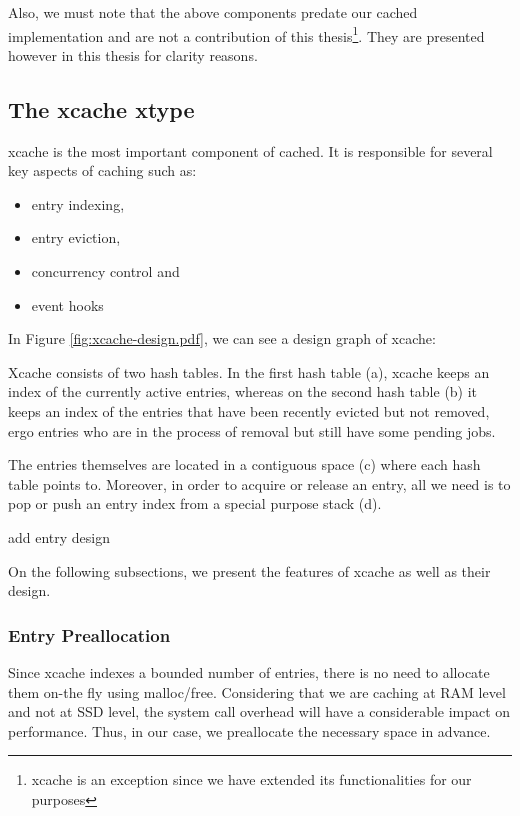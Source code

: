Also, we must note that the above components predate our cached implementation 
and are not a contribution of this thesis\footnote{xcache is an exception since 
	we have extended its functionalities for our purposes}. They are 
presented however in this thesis for clarity reasons. 

\subsection{The xcache xtype}\label{sec:xcache-design}

xcache is the most important component of cached. It is responsible for several 
key aspects of caching such as:

\begin{itemize}
	\item entry indexing,
	\item entry eviction,
	\item concurrency control and
	\item event hooks
\end{itemize}

In Figure \ref{fig:xcache-design.pdf}, we can see a design graph of xcache:


Xcache consists of two hash tables. In the first hash table (a), xcache keeps 
an index of the currently active entries, whereas on the second hash table (b) 
it keeps an index of the entries that have been recently evicted but not 
removed, ergo entries who are in the process of removal but still have some 
pending jobs.

The entries themselves are located in a contiguous space (c) where each hash 
table points to. Moreover, in order to acquire or release an entry, all we need 
is to pop or push an entry index from a special purpose stack (d).

\todo add entry design

On the following subsections, we present the features of xcache as well as 
their design.

\subsubsection{Entry Preallocation}\label{sec:xcache-entry-design}

Since xcache indexes a bounded number of entries, there is no need to allocate 
them on-the fly using malloc/free. Considering that we are caching at RAM level 
and not at SSD level, the system call overhead will have a considerable impact 
on performance. Thus, in our case, we preallocate the necessary space in 
advance.

